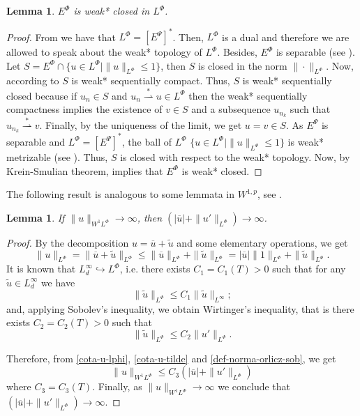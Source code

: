 \documentclass[twoside]{article}
\newtheorem{lem}[thm]{Lemma}
\theoremstyle{remark}
\newcommand{\orlnor}{\|_{L^{\Phi}}}
\newcommand{\lphi}{L^{\Phi}}
\newcommand{\ephi}{E^{\Phi}}
\newcommand{\sobnor}{\|_{W^{1}\lphi}}
\renewcommand{\leq}{\leqslant}
\newcommand{\epsi}{E^{\Psi}}
\begin{document}
\begin{lem}\label{lem:deb*cerrado}
$\ephi$ is weak* closed in $\lphi$.
\end{lem}


\begin{proof}
From \cite[Thm. 7, p. 110]{rao1991theory} we have that $\lphi=\left[\epsi\right]^*
$.
Then, $\lphi$ is a dual and therefore we are allowed to speak about the weak* topology of $\lphi$.
Besides, $\ephi
$ is separable (see \cite[Thm. 1, p. 87]{rao1991theory}).
Let $S=\ephi\cap \{u \in \lphi|\|u\orlnor\leq 1\}$, then $S$ is closed in the norm $\|\cdot\orlnor$. 
Now, according to \cite[Cor. 5, p. 148]{rao1991theory} $S$ is weak* sequentially compact. 
Thus, $S$ is weak* sequentially closed because if $u_n\in S$ and
$u_n \overset{*}{\rightharpoonup}u \in \lphi$ then  the weak* sequentially compactness implies the existence of $v \in S$ and a subsequence $u_{n_k}$ such that
$u_{n_k}\overset{*}{\rightharpoonup}v$. Finally, by the uniqueness of   the limit, we get
$u=v\in S$.
As $\epsi$ is separable and $\lphi=\left[\epsi\right]^*$, the ball of $\lphi$ $\{u \in \lphi | \|u\orlnor\leq 1\}$ is  weak* metrizable (see \cite[Thm. 5.1, p. 138]{Conway1977}).
Thus, $S$ is closed with respect to  the weak* topology. Now, by  Krein-Smulian theorem, \cite[Cor. 12.6, p. 165]{Conway1977} implies that $\ephi$ is weak* closed.
\end{proof}

The following result is analogous to some lemmata in $W^{1,p}$, see \cite{xu2007some}.
\begin{lem}\label{infinito-a-prom-upunto}
If $\|u\sobnor\to \infty$, then $(|\overline{u}|+\|u'\orlnor)\to \infty$.
\end{lem}

\begin{proof}
By the decomposition $u=\overline{u}+\tilde{u}$ and some elementary operations,
we get
\begin{equation}\label{cota-u-lphi}
\|u\orlnor=
\|\overline{u}+\tilde{u}\orlnor\leq
\|\overline{u}\orlnor+\|\tilde{u}\orlnor=
|\overline{u}|\|1\orlnor+\|\tilde{u}\orlnor.
\end{equation}
It is known that $L^{\infty}_d\hookrightarrow\lphi$, i.e.
there exists $C_1=C_1(T)>0$ such that for any $\tilde{u}\in L^{\infty}_d$ we have
\[
\|\tilde{u}\orlnor
\leq
C_1 \|\tilde{u}\|_{L^{\infty}};
\]
and, applying  Sobolev's inequality,  we obtain Wirtinger's inequality, 
that is there exists $C_2=C_2(T)>0$ such that
\begin{equation}\label{cota-u-tilde}
\|\tilde{u}\orlnor
\leq
C_2\|u'\orlnor.
\end{equation}

Therefore, from \eqref{cota-u-lphi}, \eqref{cota-u-tilde} and \eqref{def-norma-orlicz-sob},
we get
\[
\|u\sobnor\leq
C_3(|\overline{u}|+\|u'\orlnor)
\]
where $C_3=C_3(T)$. Finally, as $\|u\sobnor\to \infty$ we conclude that
$(|\overline{u}|+\|u'\orlnor)\to \infty$.
\end{proof}
\end{document}
